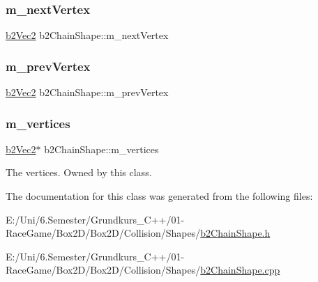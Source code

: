 \mbox{\label{classb2_chain_shape_af3716ef780dd5bcd905e350d8854aaa2}} 
\subsubsection{\texorpdfstring{m\_nextVertex}{m\_nextVertex}}
{\footnotesize\ttfamily \mbox{\hyperlink{structb2_vec2}{b2\+Vec2}} b2\+Chain\+Shape\+::m\+\_\+next\+Vertex}

\mbox{\label{classb2_chain_shape_a3a42d4c6b2421bc5badda3b6164949cf}} 
\subsubsection{\texorpdfstring{m\_prevVertex}{m\_prevVertex}}
{\footnotesize\ttfamily \mbox{\hyperlink{structb2_vec2}{b2\+Vec2}} b2\+Chain\+Shape\+::m\+\_\+prev\+Vertex}

\mbox{\label{classb2_chain_shape_a481116a6886fb3880b13e55c966579da}} 
\subsubsection{\texorpdfstring{m\_vertices}{m\_vertices}}
{\footnotesize\ttfamily \mbox{\hyperlink{structb2_vec2}{b2\+Vec2}}$\ast$ b2\+Chain\+Shape\+::m\+\_\+vertices}



The vertices. Owned by this class. 



The documentation for this class was generated from the following files\+:\begin{DoxyCompactItemize}
\item 
E\+:/\+Uni/6.\+Semester/\+Grundkurs\+\_\+\+C++/01-\/\+Race\+Game/\+Box2\+D/\+Box2\+D/\+Collision/\+Shapes/\mbox{\hyperlink{b2_chain_shape_8h}{b2\+Chain\+Shape.\+h}}\item 
E\+:/\+Uni/6.\+Semester/\+Grundkurs\+\_\+\+C++/01-\/\+Race\+Game/\+Box2\+D/\+Box2\+D/\+Collision/\+Shapes/\mbox{\hyperlink{b2_chain_shape_8cpp}{b2\+Chain\+Shape.\+cpp}}\end{DoxyCompactItemize}
